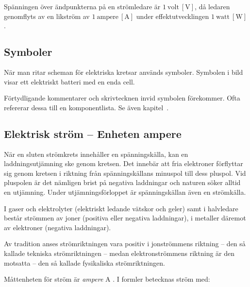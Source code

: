 Spänningen över ändpunkterna på en strömledare är \(1\ \mathrm{volt\ [V]}\), då
ledaren genomflyts av en likström av \(1\ \mathrm{ampere\ [A]}\) under
effektutvecklingen \(1\ \mathrm{watt\ [W]}\).

\subsection{Symboler}
\label{spänning.symboler}

När man ritar scheman för elektriska kretsar används symboler.
Symbolen i bild~ visar ett elektriskt batteri med en
enda cell.



Förtydligande kommentarer och skrivtecknen invid symbolen förekommer.
Ofta refererar dessa till en komponentlista.
Se även kapitel~.

\subsection{Elektrisk ström -- Enheten ampere}
\label{elektrisk_ström}

När en sluten strömkrets innehåller en spänningskälla, kan en
laddningsutjämning ske genom kretsen.
Det innebär att fria elektroner förflyttar sig genom kretsen i riktning från
spänningskällans minuspol till dess pluspol.
Vid pluspolen är det nämligen brist på negativa laddningar och naturen söker
alltid en utjämning.
Under utjämningsförloppet är spänningskällan även en strömkälla.

I gaser och elektrolyter (elektriskt ledande vätskor och geler) samt i
halvledare består strömmen av joner (positiva eller negativa laddningar),
i metaller däremot av elektroner (negativa laddningar).

Av tradition anses strömriktningen vara positiv i jonströmmens riktning -- den
så kallade tekniska strömriktningen -- medan elektronströmmens riktning är den
motsatta -- den så kallade fysikaliska strömriktningen.

Måttenheten för ström är \emph{ampere} \(\mathrm{A}\) \cite{SIbrochure8}.
I formler betecknas ström med:

